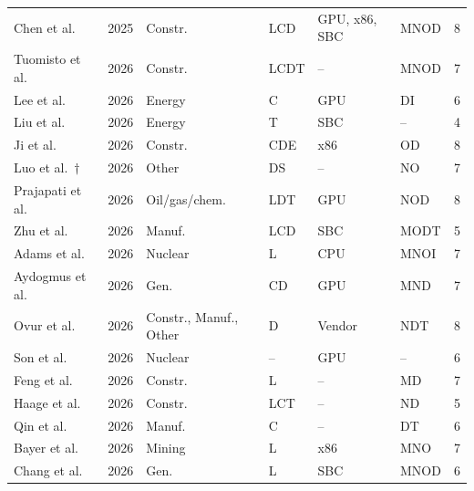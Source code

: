 \begin{longtable}{lllllll}
Chen et al.~\cite{inc:r2-0745} & 2025 & Constr. & LCD & GPU, x86, SBC & MNOD & 8\\
Tuomisto et al.~\cite{inc:paper056} & 2026 & Constr. & LCDT & -- & MNOD & 7\\
Lee et al.~\cite{inc:paper055} & 2026 & Energy & C & GPU & DI & 6\\
Liu et al.~\cite{inc:paper088} & 2026 & Energy & T & SBC & -- & 4\\
Ji et al.~\cite{inc:paper059} & 2026 & Constr. & CDE & x86 & OD & 8\\
Luo et al.~\cite{inc:paper032}$\dagger$ & 2026 & Other & DS & -- & NO & 7\\
Prajapati et al.~\cite{inc:paper008} & 2026 & Oil/gas/chem. & LDT & GPU & NOD & 8\\
Zhu et al.~\cite{inc:paper052} & 2026 & Manuf. & LCD & SBC & MODT & 5\\
Adams et al.~\cite{inc:paper046} & 2026 & Nuclear & L & CPU & MNOI & 7\\
Aydogmus et al.~\cite{inc:r2-0348} & 2026 & Gen. & CD & GPU & MND & 7\\
Ovur et al.~\cite{inc:r2-0553} & 2026 & Constr., Manuf., Other & D & Vendor & NDT & 8\\
Son et al.~\cite{inc:r2-0677} & 2026 & Nuclear & -- & GPU & -- & 6\\
Feng et al.~\cite{inc:r2-0740} & 2026 & Constr. & L & -- & MD & 7\\
Haage et al.~\cite{inc:r2-0776} & 2026 & Constr. & LCT & -- & ND & 5\\
Qin et al.~\cite{inc:r2-0934} & 2026 & Manuf. & C & -- & DT & 6\\
Bayer et al.~\cite{inc:r2-1004} & 2026 & Mining & L & x86 & MNO & 7\\
Chang et al.~\cite{inc:r2-1031} & 2026 & Gen. & L & SBC & MNOD & 6\\
\end{longtable}
